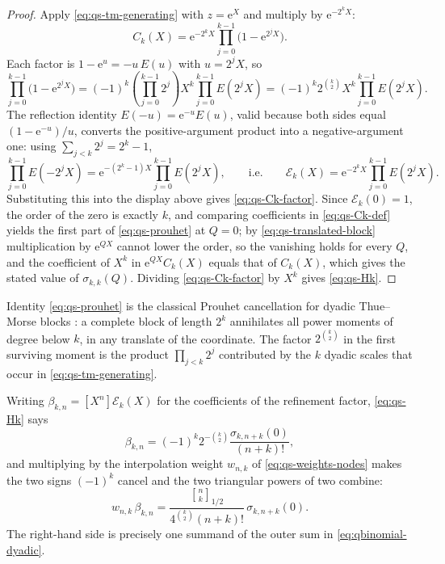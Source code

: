 \documentclass[11pt,oneside]{article}
\theoremstyle{definition}
\theoremstyle{remark}
\newcommand{\e}{\mathrm e}
\newcommand{\qbinom}[3]{\genfrac{[}{]}{0pt}{}{#1}{#2}_{#3}}
\begin{document}
\begin{proof}
Apply \eqref{eq:qs-tm-generating} with $z=\e^{X}$ and multiply by $\e^{-2^kX}$:
\begin{equation}
 C_k(X)=\e^{-2^kX}\prod_{j=0}^{k-1}\bigl(1-\e^{2^jX}\bigr). \label{eq:qs-Ck-product-raw}
\end{equation}
Each factor is $1-\e^{u}=-u\,E(u)$ with $u=2^jX$, so
\begin{equation*}
 \prod_{j=0}^{k-1}\bigl(1-\e^{2^jX}\bigr)
 =(-1)^k\left(\prod_{j=0}^{k-1}2^j\right)X^k\prod_{j=0}^{k-1}E(2^jX)
 =(-1)^k2^{\binom k2}X^k\prod_{j=0}^{k-1}E(2^jX).
\end{equation*}
The reflection identity $E(-u)=\e^{-u}E(u)$, valid because both sides equal
$(1-\e^{-u})/u$, converts the positive-argument product into a negative-argument one:
using $\sum_{j<k}2^j=2^k-1$,
\begin{equation}
 \prod_{j=0}^{k-1}E(-2^jX)=\e^{-(2^k-1)X}\prod_{j=0}^{k-1}E(2^jX),
 \qquad\text{i.e.}\qquad
 \mathscr E_k(X)=\e^{-2^kX}\prod_{j=0}^{k-1}E(2^jX).       \label{eq:qs-Ek-two-forms}
\end{equation}
Substituting this into the display above gives \eqref{eq:qs-Ck-factor}.  Since
$\mathscr E_k(0)=1$, the order of the zero is exactly $k$, and comparing coefficients in
\eqref{eq:qs-Ck-def} yields the first part of \eqref{eq:qs-prouhet} at $Q=0$; by
\eqref{eq:qs-translated-block} multiplication by $\e^{QX}$ cannot lower the order, so the
vanishing holds for every $Q$, and the coefficient of $X^k$ in
$\e^{QX}C_k(X)$ equals that of $C_k(X)$, which gives the stated value of
$\sigma_{k,k}(Q)$.  Dividing \eqref{eq:qs-Ck-factor} by $X^k$ gives \eqref{eq:qs-Hk}.
\end{proof}

Identity \eqref{eq:qs-prouhet} is the classical Prouhet cancellation for dyadic Thue--Morse
blocks \cite{allouche2003}: a complete block of length $2^k$ annihilates all power moments of
degree below $k$, in any translate of the coordinate.  The factor $2^{\binom k2}$ in the first
surviving moment is the product $\prod_{j<k}2^j$ contributed by the $k$ dyadic scales that
occur in \eqref{eq:qs-tm-generating}.

Writing $\beta_{k,n}=[X^n]\mathscr E_k(X)$ for the coefficients of the refinement factor,
\eqref{eq:qs-Hk} says
\begin{equation}
 \beta_{k,n}=(-1)^k2^{-\binom k2}\frac{\sigma_{k,n+k}(0)}{(n+k)!},   \label{eq:qs-beta-from-sigma}
\end{equation}
and multiplying by the interpolation weight $w_{n,k}$ of \eqref{eq:qs-weights-nodes} makes
the two signs $(-1)^k$ cancel and the two triangular powers of two combine:
\begin{equation}
 w_{n,k}\,\beta_{k,n}
 =\frac{\qbinom nk{1/2}}{4^{\binom k2}(n+k)!}\,\sigma_{k,n+k}(0). \label{eq:qs-weight-times-beta}
\end{equation}
The right-hand side is precisely one summand of the outer sum in
\eqref{eq:qbinomial-dyadic}.
\end{document}
